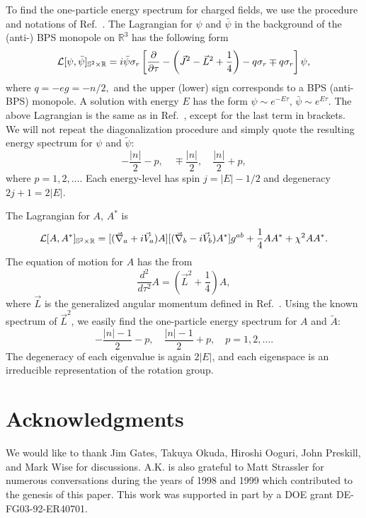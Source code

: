 \documentclass[a4paper,12pt, amsfonts, amssymb]{article}
\newcommand{\RR}{{\mathbb R}}
\renewcommand{\SS}{{\mathbb S}}
\begin{document}
To find the one-particle energy spectrum for charged fields, we use the
procedure and notations of Ref.~\cite{BKWone}.
The Lagrangian for $\psi$ and $\bar{\psi}$ in the background of the
(anti-) BPS monopole on $\RR^3$ has the following form 
$$
{\cal L}[\psi,\bar{\psi}]_{\SS^2\times\RR}=i\bar{\psi}\sigma_r
\left[{\frac{\partial}{\partial\tau}}-\left(\vec{J}^2-\vec{L}^2+
\frac14\right)-q\sigma_r \mp q\sigma_r\right]\psi,
$$
where $q=-eg=-n/2,$ and the upper (lower) sign corresponds to a BPS 
(anti-BPS) monopole. A solution with energy
$E$ has the form $\psi\sim e^{-E\tau}$, $\bar{\psi}\sim e^{E\tau}$.
The above Lagrangian is the same as in Ref.~\cite{BKWone}, except
for the last term in brackets. We will not repeat the diagonalization
procedure and simply quote the resulting energy spectrum for 
$\psi$ and $\tilde{\psi}$:
$$
-\frac{|n|}{2}-p,\quad \mp\frac{|n|}{2},\quad \frac{|n|}{2}+p,
$$
where $p=1,2,\ldots.$
Each energy-level has spin $j=|E|-1/2$ and degeneracy $2j+1=2|E|$.

The Lagrangian for $A$, $A^*$ is
$$
{\cal L}[A,A^*]_{\SS^2\times\RR}=[(\vec{\nabla}_a+i\vec{V}_a)A]
[(\vec{\nabla}_b-i\vec{V}_b)A^*]g^{ab}+\frac14 AA^*+\chi^2 AA^*.
$$
The equation of motion for $A$ has the from 
$$
\frac{d^2}{d\tau^2}A=\left(\vec{L}^2+\frac14\right)A,
$$
where $\vec{L}$ is the generalized angular momentum defined in Ref.~\cite{WY}.
Using the known spectrum of $\vec{L}^2$, we easily find the one-particle
energy spectrum for $A$ and $\tilde{A}$:
$$
-\frac{|n|-1}{2}-p,\quad \frac{|n|-1}{2}+p,\quad p=1,2,\ldots.
$$
The degeneracy of each eigenvalue is again $2|E|$, and each eigenspace
is an irreducible representation of the rotation group.

\section*{Acknowledgments}
We would like to thank Jim Gates,  Takuya Okuda, Hiroshi Ooguri,
John Preskill, and Mark Wise for discussions. A.K. is also grateful 
to Matt Strassler for numerous conversations during the years of 1998 and 1999 which contributed to the genesis of this paper. This work was supported in part by a DOE grant DE-FG03-92-ER40701.
\end{document}
